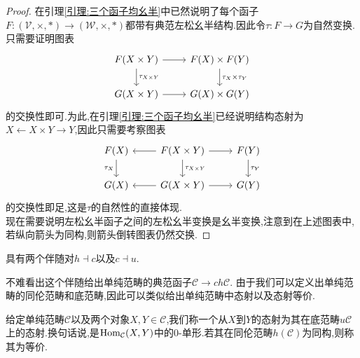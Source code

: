 \begin{proof}
    在引理\ref{引理:三个函子均幺半}中已然说明了每个函子$F:(\mathcal{V},\times,*)\to(\mathcal{W},\times,*)$都带有典范左松幺半结构.因此令$\tau :F \to G$为自然变换.只需要证明图表
    \[\begin{tikzcd}
	{F(X\times Y)} & {F(X)\times F(Y)} \\
	{G(X\times Y)} & {G(X)\times G(Y)}
	\arrow[from=1-1, to=1-2]
	\arrow["{\tau_{X\times Y}}", from=1-1, to=2-1]
	\arrow["{\tau_X\times \tau_Y}", from=1-2, to=2-2]
	\arrow[from=2-1, to=2-2]
    \end{tikzcd}\]
    的交换性即可.为此,在引理\ref{引理:三个函子均幺半}已经说明结构态射为$X\leftarrow X\times Y \rightarrow Y$,因此只需要考察图表
    \[\begin{tikzcd}
	{F(X)} & {F(X\times Y)} & {F(Y)} \\
	{G(X)} & {G(X\times Y)} & {G(Y)}
	\arrow["{\tau_X}"', from=1-1, to=2-1]
	\arrow[from=1-2, to=1-1]
	\arrow[from=1-2, to=1-3]
	\arrow["{\tau_{X\times Y}}", from=1-2, to=2-2]
	\arrow["{\tau_Y}", from=1-3, to=2-3]
	\arrow[from=2-2, to=2-1]
	\arrow[from=2-2, to=2-3]
    \end{tikzcd}\]
    的交换性即足,这是$\tau$的自然性的直接体现.\\
    现在需要说明左松幺半函子之间的左松幺半变换是幺半变换,注意到在上述图表中,若纵向箭头为同构,则箭头倒转图表仍然交换.
\end{proof}
\begin{corollary}
    具有两个伴随对$h\dashv c$以及$c \dashv u$.
\end{corollary}
不难看出这个伴随给出单纯范畴的典范函子$\mathcal{C}\to ch\mathcal{C}$.
由于我们可以定义出单纯范畴的同伦范畴和底范畴,因此可以类似给出单纯范畴中态射以及态射等价.
\begin{definition}
    给定单纯范畴$\mathcal{C}$以及两个对象$X,Y\in \mathcal{C}$,我们称一个从$X$到$Y$的态射为其在底范畴$u\mathcal{C}$上的态射.换句话说,是$\operatorname{Hom}_{\mathcal{C}}(X,Y)$中的$0$-单形.若其在同伦范畴$h(\mathcal{C})$为同构,则称其为等价.
\end{definition}
